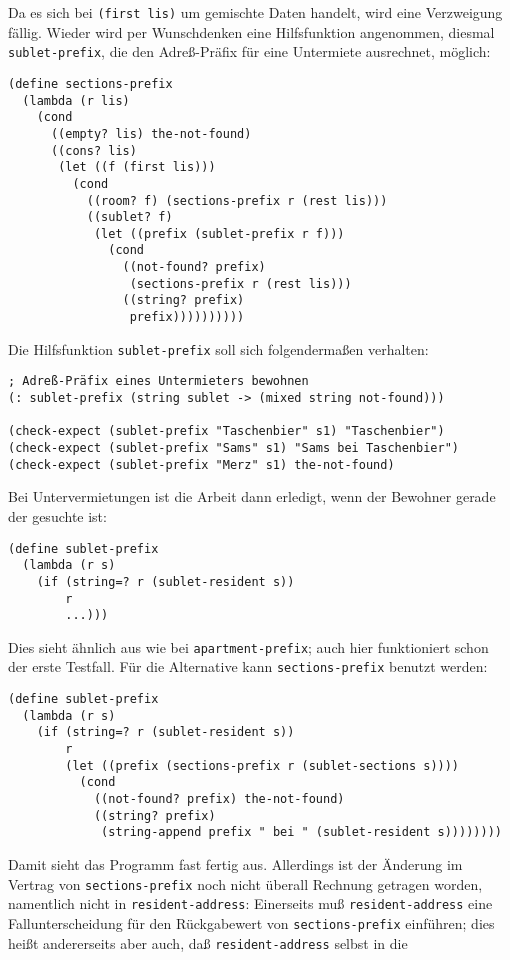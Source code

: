 %
Da es sich bei \texttt{(first lis)} um gemischte Daten handelt, wird
eine Verzweigung fällig.  Wieder wird per Wunschdenken eine
Hilfsfunktion angenommen, diesmal \texttt{sublet-prefix}, die den
Adreß-Präfix für eine Untermiete ausrechnet, möglich:
%
\begin{verbatim}
(define sections-prefix
  (lambda (r lis)
    (cond
      ((empty? lis) the-not-found)
      ((cons? lis)
       (let ((f (first lis)))
         (cond
           ((room? f) (sections-prefix r (rest lis)))
           ((sublet? f)
            (let ((prefix (sublet-prefix r f)))
              (cond
                ((not-found? prefix)
                 (sections-prefix r (rest lis)))
                ((string? prefix)
                 prefix))))))))))
\end{verbatim}
%
Die Hilfsfunktion \texttt{sublet-prefix} soll sich folgendermaßen verhalten:
%
\begin{verbatim}
; Adreß-Präfix eines Untermieters bewohnen
(: sublet-prefix (string sublet -> (mixed string not-found)))

(check-expect (sublet-prefix "Taschenbier" s1) "Taschenbier")
(check-expect (sublet-prefix "Sams" s1) "Sams bei Taschenbier")
(check-expect (sublet-prefix "Merz" s1) the-not-found)
\end{verbatim}
%
Bei Untervermietungen ist die Arbeit dann erledigt, wenn der Bewohner
gerade der gesuchte ist:
%
\begin{verbatim}
(define sublet-prefix
  (lambda (r s)
    (if (string=? r (sublet-resident s))
        r
        ...)))
\end{verbatim}
%
Dies sieht ähnlich aus wie bei \texttt{apartment-prefix}; auch hier
funktioniert schon der erste Testfall.  Für die Alternative kann
\texttt{sections-prefix} benutzt werden:
%
\begin{verbatim}
(define sublet-prefix
  (lambda (r s)
    (if (string=? r (sublet-resident s))
        r
        (let ((prefix (sections-prefix r (sublet-sections s))))
          (cond
            ((not-found? prefix) the-not-found)
            ((string? prefix)
             (string-append prefix " bei " (sublet-resident s))))))))
\end{verbatim}
%
Damit sieht das Programm fast fertig aus. Allerdings ist der Änderung
im Vertrag von \texttt{sections-prefix} noch nicht überall Rechnung
getragen worden, namentlich nicht in \texttt{resident-address}:
Einerseits muß \texttt{resident-address} eine Fallunterscheidung für
den Rückgabewert von \texttt{sections-prefix} einführen; dies heißt
andererseits aber auch, daß \texttt{resident-address} selbst in die
